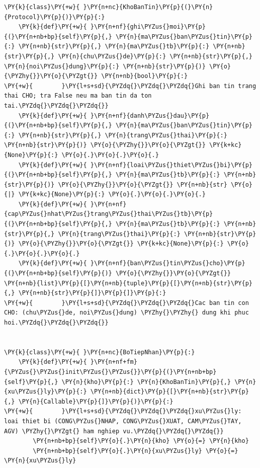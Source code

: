 \begin{Verbatim}[commandchars=\\\{\},frame=single,framerule=0.3pt,rulecolor=\color{black!40},fontsize=\footnotesize,breaklines=true]
\PY{k}{class}\PY{+w}{ }\PY{n+nc}{KhoBanTin}\PY{p}{(}\PY{n}{Protocol}\PY{p}{)}\PY{p}{:}
    \PY{k}{def}\PY{+w}{ }\PY{n+nf}{ghi\PYZus{}moi}\PY{p}{(}\PY{n+nb+bp}{self}\PY{p}{,} \PY{n}{ma\PYZus{}ban\PYZus{}tin}\PY{p}{:} \PY{n+nb}{str}\PY{p}{,} \PY{n}{ma\PYZus{}tb}\PY{p}{:} \PY{n+nb}{str}\PY{p}{,} \PY{n}{chu\PYZus{}de}\PY{p}{:} \PY{n+nb}{str}\PY{p}{,} \PY{n}{noi\PYZus{}dung}\PY{p}{:} \PY{n+nb}{str}\PY{p}{)} \PY{o}{\PYZhy{}}\PY{o}{\PYZgt{}} \PY{n+nb}{bool}\PY{p}{:}
\PY{+w}{        }\PY{l+s+sd}{\PYZdq{}\PYZdq{}\PYZdq{}Ghi ban tin trang thai CHO; tra False neu ma ban tin da ton tai.\PYZdq{}\PYZdq{}\PYZdq{}}
    \PY{k}{def}\PY{+w}{ }\PY{n+nf}{danh\PYZus{}dau}\PY{p}{(}\PY{n+nb+bp}{self}\PY{p}{,} \PY{n}{ma\PYZus{}ban\PYZus{}tin}\PY{p}{:} \PY{n+nb}{str}\PY{p}{,} \PY{n}{trang\PYZus{}thai}\PY{p}{:} \PY{n+nb}{str}\PY{p}{)} \PY{o}{\PYZhy{}}\PY{o}{\PYZgt{}} \PY{k+kc}{None}\PY{p}{:} \PY{o}{.}\PY{o}{.}\PY{o}{.}
    \PY{k}{def}\PY{+w}{ }\PY{n+nf}{loai\PYZus{}thiet\PYZus{}bi}\PY{p}{(}\PY{n+nb+bp}{self}\PY{p}{,} \PY{n}{ma\PYZus{}tb}\PY{p}{:} \PY{n+nb}{str}\PY{p}{)} \PY{o}{\PYZhy{}}\PY{o}{\PYZgt{}} \PY{n+nb}{str} \PY{o}{|} \PY{k+kc}{None}\PY{p}{:} \PY{o}{.}\PY{o}{.}\PY{o}{.}
    \PY{k}{def}\PY{+w}{ }\PY{n+nf}{cap\PYZus{}nhat\PYZus{}trang\PYZus{}thai\PYZus{}tb}\PY{p}{(}\PY{n+nb+bp}{self}\PY{p}{,} \PY{n}{ma\PYZus{}tb}\PY{p}{:} \PY{n+nb}{str}\PY{p}{,} \PY{n}{trang\PYZus{}thai}\PY{p}{:} \PY{n+nb}{str}\PY{p}{)} \PY{o}{\PYZhy{}}\PY{o}{\PYZgt{}} \PY{k+kc}{None}\PY{p}{:} \PY{o}{.}\PY{o}{.}\PY{o}{.}
    \PY{k}{def}\PY{+w}{ }\PY{n+nf}{ban\PYZus{}tin\PYZus{}cho}\PY{p}{(}\PY{n+nb+bp}{self}\PY{p}{)} \PY{o}{\PYZhy{}}\PY{o}{\PYZgt{}} \PY{n+nb}{list}\PY{p}{[}\PY{n+nb}{tuple}\PY{p}{[}\PY{n+nb}{str}\PY{p}{,} \PY{n+nb}{str}\PY{p}{]}\PY{p}{]}\PY{p}{:}
\PY{+w}{        }\PY{l+s+sd}{\PYZdq{}\PYZdq{}\PYZdq{}Cac ban tin con CHO: (chu\PYZus{}de, noi\PYZus{}dung) \PYZhy{}\PYZhy{} dung khi phuc hoi.\PYZdq{}\PYZdq{}\PYZdq{}}


\PY{k}{class}\PY{+w}{ }\PY{n+nc}{BoTiepNhan}\PY{p}{:}
    \PY{k}{def}\PY{+w}{ }\PY{n+nf+fm}{\PYZus{}\PYZus{}init\PYZus{}\PYZus{}}\PY{p}{(}\PY{n+nb+bp}{self}\PY{p}{,} \PY{n}{kho}\PY{p}{:} \PY{n}{KhoBanTin}\PY{p}{,} \PY{n}{xu\PYZus{}ly}\PY{p}{:} \PY{n+nb}{dict}\PY{p}{[}\PY{n+nb}{str}\PY{p}{,} \PY{n}{Callable}\PY{p}{]}\PY{p}{)}\PY{p}{:}
\PY{+w}{        }\PY{l+s+sd}{\PYZdq{}\PYZdq{}\PYZdq{}xu\PYZus{}ly: loai thiet bi (CONG\PYZus{}NHAP, CONG\PYZus{}XUAT, CAM\PYZus{}TAY, AGV) \PYZhy{}\PYZgt{} ham nghiep vu.\PYZdq{}\PYZdq{}\PYZdq{}}
        \PY{n+nb+bp}{self}\PY{o}{.}\PY{n}{kho} \PY{o}{=} \PY{n}{kho}
        \PY{n+nb+bp}{self}\PY{o}{.}\PY{n}{xu\PYZus{}ly} \PY{o}{=} \PY{n}{xu\PYZus{}ly}


\end{Verbatim}
